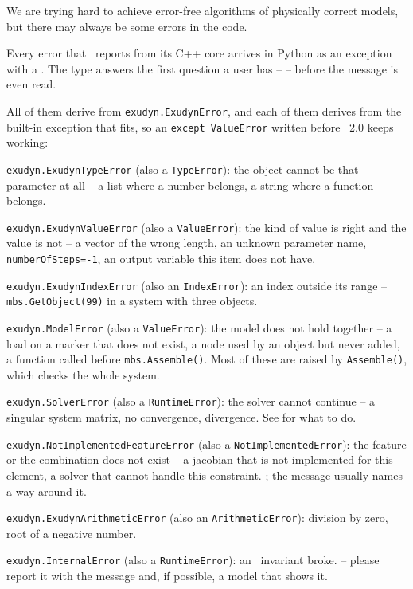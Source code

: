 We are trying hard to achieve error-free algorithms of physically correct models, but there may always be some errors in the code.

%
Every error that \codeName\ reports from its C++ core arrives in Python as an exception with a
. The type answers the first question a user has --  --
before the message is even read.

All of them derive from \texttt{exudyn.ExudynError}, and each of them  derives from
the built-in exception that fits, so an \texttt{except ValueError} written before \codeName\ 2.0
keeps working:
\bi
  \item \texttt{exudyn.ExudynTypeError} (also a \texttt{TypeError}): the object cannot be that parameter at all -- a list where a number belongs, a string where a function belongs.
  \item \texttt{exudyn.ExudynValueError} (also a \texttt{ValueError}): the kind of value is right and the value is not -- a vector of the wrong length, an unknown parameter name, \texttt{numberOfSteps=-1}, an output variable this item does not have.
  \item \texttt{exudyn.ExudynIndexError} (also an \texttt{IndexError}): an index outside its range -- \texttt{mbs.GetObject(99)} in a system with three objects.
  \item \texttt{exudyn.ModelError} (also a \texttt{ValueError}): the model  does not hold together -- a load on a marker that does not exist, a node used by an object but never added, a function called before \texttt{mbs.Assemble()}. Most of these are raised by \texttt{Assemble()}, which checks the whole system.
  \item \texttt{exudyn.SolverError} (also a \texttt{RuntimeError}): the solver cannot continue -- a singular system matrix, no convergence, divergence. See  for what to do.
  \item \texttt{exudyn.NotImplementedFeatureError} (also a \texttt{NotImplementedError}): the feature or the combination does not exist -- a jacobian that is not implemented for this element, a solver that cannot handle this constraint. ; the message usually names a way around it.
  \item \texttt{exudyn.ExudynArithmeticError} (also an \texttt{ArithmeticError}): division by zero, root of a negative number.
  \item \texttt{exudyn.InternalError} (also a \texttt{RuntimeError}): an \codeName\ invariant broke.  -- please report it with the message and, if possible, a model that shows it.
\ei

